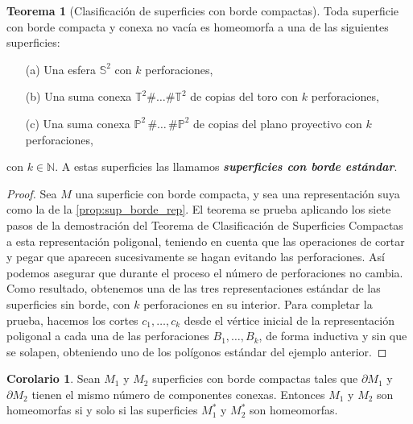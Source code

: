 \documentclass[10pt]{report}
\newcommand{\N}{\mathbb{N}}
\newcommand{\Esfera}{\mathbb{S}^2}
\newcommand{\Toro}{\mathbb{T}^2}
\newcommand{\Proyectivo}{\mathbb{P}^2}
\newcommand{\enfatiza}[1]{\textbf{\textit{#1}}}
\theoremstyle{definition}
\newtheorem{tma}[defin]{Teorema}
\newtheorem{corol}[defin]{Corolario}
\begin{document}
\begin{tma}[Clasificación de superficies con borde compactas]
Toda superficie con borde compacta y conexa no vacía es homeomorfa a una de las siguientes superficies:
\begin{itemize}
\item[(a)] Una esfera $\Esfera$ con $k$ perforaciones,
\item[(b)] Una suma conexa $\Toro \# \dots \# \Toro$ de copias del toro con $k$ perforaciones,
\item[(c)] Una suma conexa $\Proyectivo \,  \# \dots\, \# \Proyectivo$ de copias del plano proyectivo con $k$ perforaciones,
\end{itemize}
con $k\in \N$.
A estas superficies las llamamos \enfatiza{superficies con borde estándar}.
\end{tma}
\begin{proof}
Sea $M$ una superficie con borde compacta, y sea una representación suya como la de la \autoref{prop:sup_borde_rep}. El teorema se prueba aplicando los siete pasos de la demostración del Teorema de Clasificación de Superficies Compactas a esta representación poligonal, teniendo en cuenta que las operaciones de cortar y pegar que aparecen sucesivamente se hagan evitando las perforaciones. Así podemos asegurar que durante el proceso el número de perforaciones no cambia. Como resultado, obtenemos una de las tres representaciones estándar de las superficies sin borde, con $k$ perforaciones en su interior. Para completar la prueba, hacemos los cortes $c_1,\dots ,c_k$ desde el vértice inicial de la representación poligonal a cada una de las perforaciones $B_1,\dots ,B_k$, de forma inductiva y sin que se solapen, obteniendo uno de los polígonos estándar del ejemplo anterior.
\end{proof}

\begin{corol}
Sean $M_1$ y $M_2$ superficies con borde compactas tales que $\partial M_1$ y $\partial M_2$ tienen el mismo número de componentes conexas. Entonces $M_1$ y $M_2$ son homeomorfas si y solo si las superficies $M_1^*$ y $M_2^*$  son homeomorfas.
\end{corol}
\end{document}
